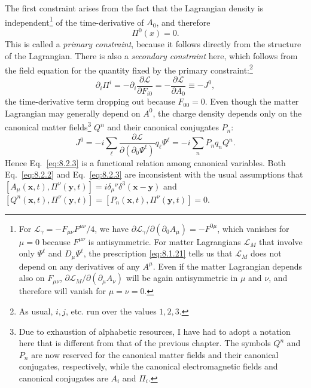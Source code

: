 The first constraint arises from the fact that the Lagrangian density is
independent\footnote{For $\mathcal L_\gamma=-F_{\mu\nu}F^{\mu\nu}/4$, we have
$\partial\mathcal L_\gamma/\partial(\partial_0A_\mu)=-F^{0\mu}$, which vanishes
for $\mu=0$ because $F^{\mu\nu}$ is antisymmetric. For matter Lagrangians
$\mathcal L_M$ that involve only $\Psi^\ell$ and $D_\mu\Psi^\ell$, the
prescription \eqref{eq:8.1.21} tells us that $\mathcal L_M$ does not depend on any
derivatives of any $A^\mu$. Even if the matter Lagrangian depends also on
$F_{\mu\nu}$, $\partial\mathcal L_M/\partial(\partial_\mu A_\nu)$ will be again
antisymmetric in $\mu$ and $\nu$, and therefore will vanish for $\mu=\nu=0$.}
of the time-derivative of $A_0$, and therefore
\begin{equation}
  \Pi^0(x)=0.
  \tag{8.2.2}\label{eq:8.2.2}
\end{equation}
This is called a \textit{primary constraint}, because it follows directly from
the structure of the Lagrangian. There is also a \textit{secondary constraint}
here, which follows from the field equation for the quantity fixed by the
primary constraint:\footnote{As usual, $i,j$, etc. run over the values $1,2,3$.}
\begin{equation}
  \partial_i\Pi^i=-\partial_i\frac{\partial\mathcal L}{\partial F_{i0}}
  =-\frac{\partial\mathcal L}{\partial A_0}\equiv-J^0,
  \tag{8.2.3}\label{eq:8.2.3}
\end{equation}
the time-derivative term dropping out because $F_{00}=0$. Even though
the matter Lagrangian may generally depend on $A^0$, the charge density
depends only on the canonical matter fields\footnote{Due to exhaustion of
alphabetic resources, I have had to adopt a notation here that is different
from that of the previous chapter. The symbols $Q^n$ and $P_n$ are now
reserved for the canonical matter fields and their canonical conjugates,
respectively, while the canonical electromagnetic fields and canonical
conjugates are $A_i$ and $\Pi_i$.} $Q^n$ and their canonical conjugates $P_n$:
\begin{equation}
  J^0=-i\sum_\ell
  \frac{\partial\mathcal L}{\partial(\partial_0\Psi^\ell)}q_\ell\Psi^\ell
  =-i\sum_n P_nq_nQ^n.
  \tag{8.2.4}\label{eq:8.2.4}
\end{equation}
Hence Eq.~\eqref{eq:8.2.3} is a functional relation among canonical variables.
Both Eq.~\eqref{eq:8.2.2} and Eq.~\eqref{eq:8.2.3} are inconsistent with the usual
assumptions that
$[A_\mu(\mathbf x,t),\Pi^\nu(\mathbf y,t)]
=i\delta_\mu{}^\nu\delta^3(\mathbf x-\mathbf y)$ and
$[Q^n(\mathbf x,t),\Pi^\nu(\mathbf y,t)]
=[P_n(\mathbf x,t),\Pi^\nu(\mathbf y,t)]=0$.

